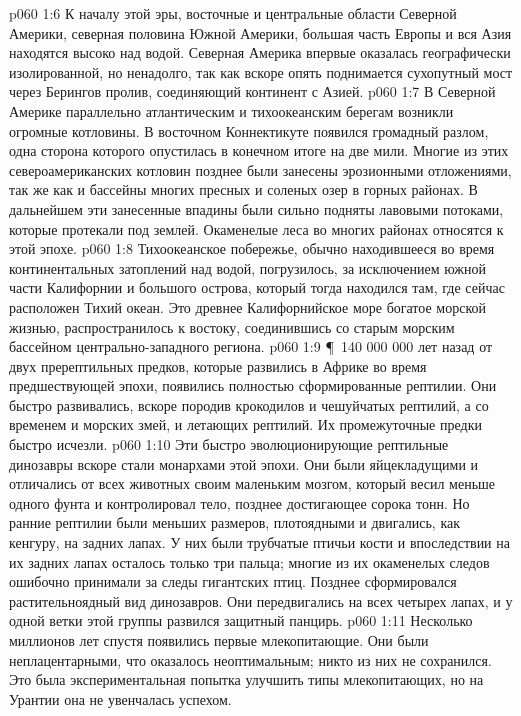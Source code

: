 \vs p060 1:6 К началу этой эры, восточные и центральные области Северной Америки, северная половина Южной Америки, большая часть Европы и вся Азия находятся высоко над водой. Северная Америка впервые оказалась географически изолированной, но ненадолго, так как вскоре опять поднимается сухопутный мост через Берингов пролив, соединяющий континент с Азией.
\vs p060 1:7 В Северной Америке параллельно атлантическим и тихоокеанским берегам возникли огромные котловины. В восточном Коннектикуте появился громадный разлом, одна сторона которого опустилась в конечном итоге на две мили. Многие из этих североамериканских котловин позднее были занесены эрозионными отложениями, так же как и бассейны многих пресных и соленых озер в горных районах. В дальнейшем эти занесенные впадины были сильно подняты лавовыми потоками, которые протекали под землей. Окаменелые леса во многих районах относятся к этой эпохе.
\vs p060 1:8 Тихоокеанское побережье, обычно находившееся во время континентальных затоплений над водой, погрузилось, за исключением южной части Калифорнии и большого острова, который тогда находился там, где сейчас расположен Тихий океан. Это древнее Калифорнийское море богатое морской жизнью, распространилось к востоку, соединившись со старым морским бассейном центрально\hyp{}западного региона.
\vs p060 1:9 \P\ 140 000 000 лет назад от двух пререптильных предков, которые развились в Африке во время предшествующей эпохи,  появились полностью сформированные рептилии. Они быстро развивались, вскоре породив крокодилов и чешуйчатых рептилий, а со временем и морских змей, и летающих рептилий. Их промежуточные предки быстро исчезли.
\vs p060 1:10 Эти быстро эволюционирующие рептильные динозавры вскоре стали монархами этой эпохи. Они были яйцекладущими и отличались от всех животных своим маленьким мозгом, который весил меньше одного фунта и контролировал тело, позднее достигающее сорока тонн. Но ранние рептилии были меньших размеров, плотоядными и двигались, как кенгуру, на задних лапах. У них были трубчатые птичьи кости и впоследствии на их задних лапах осталось только три пальца; многие из их окаменелых следов ошибочно принимали за следы гигантских птиц. Позднее сформировался растительноядный вид динозавров. Они передвигались на всех четырех лапах, и у одной ветки этой группы развился защитный панцирь.
\vs p060 1:11 Несколько миллионов лет спустя появились первые млекопитающие. Они были неплацентарными, что оказалось неоптимальным; никто из них не сохранился. Это была экспериментальная попытка улучшить типы млекопитающих, но на Урантии она не увенчалась успехом.
